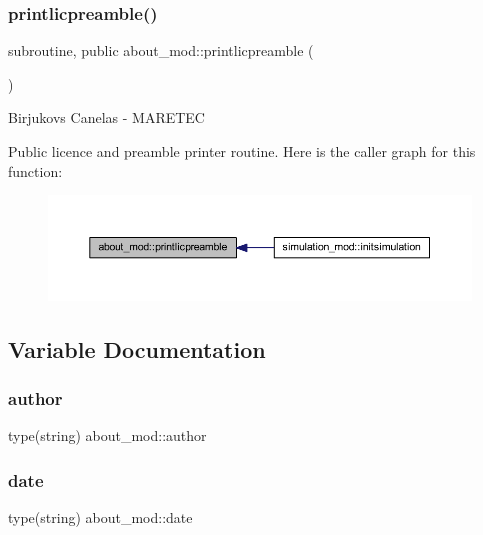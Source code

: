 \subsubsection{\texorpdfstring{printlicpreamble()}{printlicpreamble()}}
{\footnotesize\ttfamily subroutine, public about\+\_\+mod\+::printlicpreamble (\begin{DoxyParamCaption}{ }\end{DoxyParamCaption})}



Birjukovs Canelas -\/ M\+A\+R\+E\+T\+EC 

Public licence and preamble printer routine. Here is the caller graph for this function\+:
\nopagebreak
\begin{figure}[H]
\begin{center}
\leavevmode
\includegraphics[width=350pt]{namespaceabout__mod_a9fb866e1576b843b42649d84b80f4b52_icgraph}
\end{center}
\end{figure}


\subsection{Variable Documentation}
\mbox{\label{namespaceabout__mod_a7c3a72ae7ba5fc7d8a4bf133605f58c3}} 
\subsubsection{\texorpdfstring{author}{author}}
{\footnotesize\ttfamily type(string) about\+\_\+mod\+::author\hspace{0.3cm}{\ttfamily [private]}}

\mbox{\label{namespaceabout__mod_aaac12f65380fb0f10916b3744d9e5a0b}} 
\subsubsection{\texorpdfstring{date}{date}}
{\footnotesize\ttfamily type(string) about\+\_\+mod\+::date\hspace{0.3cm}{\ttfamily [private]}}

